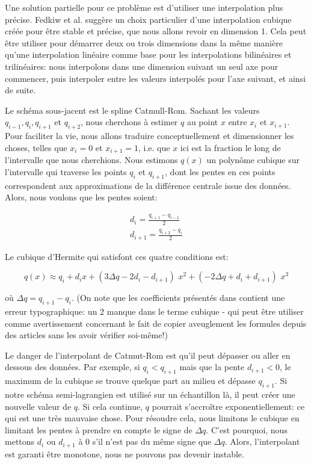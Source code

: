 \documentclass[11pt]{report}
\begin{document}
Une solution partielle pour ce problème est d'utiliser une interpolation plus précise. Fedkiw et al. \cite{fedkiw-stam-jensen-01} suggère un choix particulier d'une interpolation cubique créée pour être stable et précise, que nous allons revoir en dimension 1. Cela peut être utiliser pour démarrer deux ou trois dimensions dans la même manière qu'une interpolation linéaire comme base pour les interpolations bilinéaires et trilinéaires: nous interpolons dans une dimension suivant un seul axe pour commencer, puis interpoler entre les valeurs  interpolés pour l'axe suivant, et ainsi de suite.\newline

Le schéma sous-jacent est le spline Catmull-Rom. Sachant les valeurs $q_{i-1}, q_i, q_{i+1} $ et $q_{i+2}$, nous cherchons à estimer $q$ au point $x$ entre $x_i$ et $x_{i+1}$. Pour faciliter la vie, nous allons traduire conceptuellement et dimensionner les choses, telles que $x_i = 0$ et $x_{i+1} = 1$, i.e. que $x$ ici est la fraction le long de l'intervalle que nous cherchions. Nous estimons $q(x)$ un polynôme cubique sur l'intervalle qui traverse les points $q_i$ et $q_{i+1}$, dont les pentes en ces points correspondent aux approximations de la différence centrale issue des données. Alors, nous voulons que les pentes soient:

\begin{eqnarray}
d_i = \frac{q_{i+1} - q_{i-1}}{2}\\
d_{i+1} = \frac{q_{i+2} - q_i}{2}
\end{eqnarray}
  
Le cubique d'Hermite qui satisfont ces quatre conditions est:

\begin{equation}
q(x) \approx q_i + d_i x + (3 \Delta q - 2 d_i - d_{i+1}) \,\, x^2 + (-2 \Delta q + d_i + d_{i+1}) \,\, x^3
\end{equation}

où $\Delta q = q_{i+1} - q_i$. (On note que les coefficients présentés dans \cite{fedkiw-stam-jensen-01} contient une erreur typographique: un 2 manque dans le terme cubique - qui peut être utiliser comme avertissement concernant le fait de copier aveuglement les formules depuis des articles sans les avoir vérifier soi-même!)

Le danger de l'interpolant de Catmut-Rom est qu'il peut dépasser ou aller en dessous des données. Par exemple, si $q_i < q_{i+1}$ mais que la pente $d_{i+1} < 0$, le maximum de la cubique se trouve quelque part au milieu et dépasse $q_{i+1}$. Si notre schéma semi-lagrangien est utilisé sur un échantillon là, il peut créer une nouvelle valeur de $q$. Si cela continue, $q$ pourrait s'accroître exponentiellement: ce qui est une très mauvaise chose. Pour résoudre cela, nous limitons le cubique en limitant les pentes à prendre en compte le signe de $\Delta q$. C'est pourquoi, nous mettons $d_i$ ou $d_{i+1}$ à $0$ s'il n'est pas du même signe que $\Delta q$. Alors, l'interpolant est garanti être monotone, nous ne pouvons pas devenir instable.   
\end{document}
